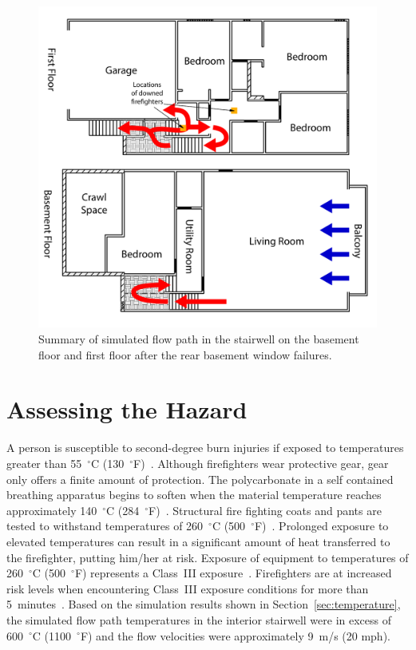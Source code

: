 \documentclass[12pt,oneside]{book}
\begin{document}
\begin{figure}[!ht]
\includegraphics[width=5.0in]{../Figures/Flow_Path_Top}
\caption{Summary of simulated flow path in the stairwell on the basement floor and first floor after the rear basement window failures.}
\label{fig:flow_path_top}
\end{figure}

\section{Assessing the Hazard}
\label{sec:assessing_the_hazard}

A person is susceptible to second-degree burn injuries if exposed to temperatures greater than 55~$^{\circ}$C (130~$^{\circ}$F)~\cite{contactburn}. Although firefighters wear protective gear, gear only offers a finite amount of protection. The polycarbonate in a self contained breathing apparatus begins to soften when the material temperature reaches approximately 140~$^{\circ}$C (284~$^{\circ}$F)~\cite{mensch2011emergency}. Structural fire fighting coats and pants are tested to withstand temperatures of 260~$^{\circ}$C (500~$^{\circ}$F)~\cite{nfpa2013standard}. Prolonged exposure to elevated temperatures can result in a significant amount of heat transferred to the firefighter, putting him/her at risk. Exposure of equipment to temperatures of 260~$^{\circ}$C (500~$^{\circ}$F) represents a Class~III exposure~\cite{Donnelly2006}. Firefighters are at increased risk levels when encountering Class~III exposure conditions for more than 5~minutes~\cite{Donnelly2006}. Based on the simulation results shown in Section~\ref{sec:temperature}, the simulated flow path temperatures in the interior stairwell were in excess of 600~$^{\circ}$C (1100~$^{\circ}$F) and the flow velocities were approximately 9~m/s (20 mph).
\end{document}

